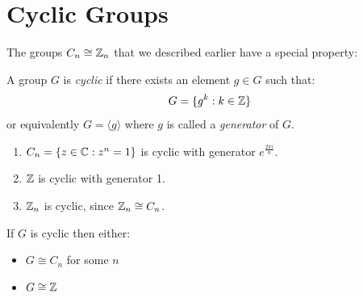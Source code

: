 \documentclass[../main.tex]{subfiles}
\begin{document}
\section{Cyclic Groups}
The groups $C_n \cong \mathbb{Z}_n$ that we described earlier have a special property:
\begin{definition}
  A group $G$ is \textit{cyclic} if there exists an element $g \in G$ such that:
  \[
    G = \{g^{k} : k \in \mathbb{Z}\}
  \]
  or equivalently $G = \langle g \rangle$ where $g$ is called a \textit{generator} of $G$.
\end{definition}
\begin{example}
  \begin{enumerate}
    \item $C_n =  \{z \in \mathbb{C}: z^{n} = 1\}$ is cyclic with generator $e^{\frac{2\pi i}{n}}$.
    \item $\mathbb{Z}$ is cyclic with generator 1.
    \item $\mathbb{Z}_n$ is cyclic, since $\mathbb{Z}_n \cong C_n$.
  \end{enumerate}
\end{example}
\begin{theorem}
  If $G$ is cyclic then either:
  \begin{itemize}
    \item $G \cong C_n$ for some $n$
    \item $G \cong \mathbb{Z}$
  \end{itemize}
\end{theorem}
\end{document}
